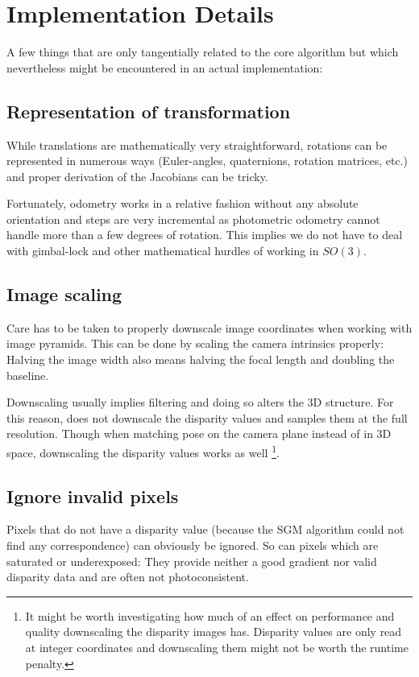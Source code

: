 \chapter{Implementation Details}

A few things that are only tangentially related to the core algorithm but which
nevertheless might be encountered in an actual implementation:

\section{Representation of transformation}

While translations are mathematically very straightforward, rotations can be
represented in numerous ways (Euler-angles, quaternions, rotation matrices,
etc.) and proper derivation of the Jacobians can be tricky.

Fortunately, odometry works in a relative fashion without any absolute
orientation and steps are very incremental as photometric odometry cannot
handle more than a few degrees of rotation. This implies we do not have to deal
with gimbal-lock and other mathematical hurdles of working in $SO(3)$.

\section{Image scaling}

Care has to be taken to properly downscale image coordinates when working with
image pyramids. This can be done by scaling the camera intrinsics properly:
Halving the image width also means halving the focal length and doubling the
baseline.

Downscaling usually implies filtering and doing so alters the 3D structure. For
this reason, \cite{comport2007odometry} does not downscale the disparity values and
samples them at the full resolution. Though when matching pose on the camera plane
instead of in 3D space, downscaling the disparity values works as well
\footnote{It might be worth investigating how much of an effect on performance
and quality downscaling the disparity images has. Disparity values are only
read at integer coordinates and downscaling them might not be worth the runtime
penalty.}.

\section{Ignore invalid pixels}

Pixels that do not have a disparity value (because the SGM algorithm could not
find any correspondence) can obviously be ignored. So can pixels which are
saturated or underexposed: They provide neither a good gradient nor valid
disparity data and are often not photoconsistent.

